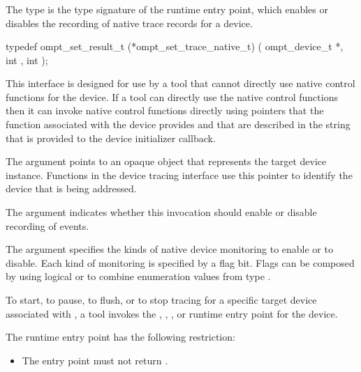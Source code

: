 \subsubsection{}
\label{sec:ompt_set_trace_native_t}

\summary
The  type is the type signature of the 
 runtime entry point, which enables or disables 
the recording of native trace records for a device.

\format
\begin{ccppspecific}
\begin{omptInquiry}
typedef ompt_set_result_t (*ompt_set_trace_native_t) (
  ompt_device_t *,
  int ,
  int 
);
\end{omptInquiry}
\end{ccppspecific}

\descr
This interface is designed for use by a tool that cannot directly use 
native control functions for the device. If a tool can directly use the
native control functions then it can invoke native control functions
directly using pointers that the  function associated with 
the device provides and that are described in the 
string that is provided to the device initializer callback.

\argdesc
The  argument points to an opaque object that represents
the target device instance. Functions in the device tracing interface
use this pointer to identify the device that is being addressed.

The  argument indicates whether this invocation should 
enable or disable recording of events.

The  argument specifies the kinds of native device monitoring 
to enable or to disable. Each kind of monitoring is specified by a flag bit.
Flags can be composed by using logical {\ttfamily or}  to combine enumeration
values from type . 

To start, to pause, to flush, or to stop tracing for a specific target device
associated with , a tool invokes the , 
, , or  
runtime entry point for the device.

\restrictions
The  runtime entry point has the following restriction:

\begin{itemize}
\item The entry point must not return .
\end{itemize}

